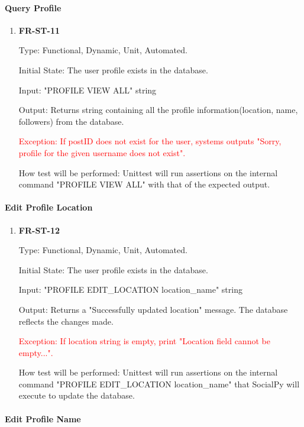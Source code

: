 \documentclass[12pt, titlepage]{article}
\begin{document}
\paragraph{Query Profile}

\begin{enumerate}

\item{\textbf{FR-ST-11}}

Type: Functional, Dynamic, Unit, Automated.
					
Initial State: The user profile exists in the database.
					
Input: "PROFILE VIEW ALL" string
					
Output: Returns string containing all the profile information(location, name, followers) from the database.

\textcolor{red}{Exception: If postID does not exist for the user, systems outputs "Sorry, profile for the given username does not exist".}
					
How test will be performed: Unittest will run assertions on the internal command "PROFILE VIEW ALL" with that of the expected output.
\end{enumerate}

\paragraph{Edit Profile Location}

\begin{enumerate}

\item{\textbf{FR-ST-12}}

Type: Functional, Dynamic, Unit, Automated.
					
Initial State: The user profile exists in the database.
					
Input: "PROFILE EDIT\_LOCATION location\_name" string
					
Output: Returns a "Successfully updated location" message. The database reflects the changes made. 

\textcolor{red}{Exception: If location string is empty, print "Location field cannot be empty...".}
					
How test will be performed: Unittest will run assertions on the internal command "PROFILE EDIT\_LOCATION location\_name" that SocialPy will execute to update the database.
\end{enumerate}

\paragraph{Edit Profile Name}
\end{document}
